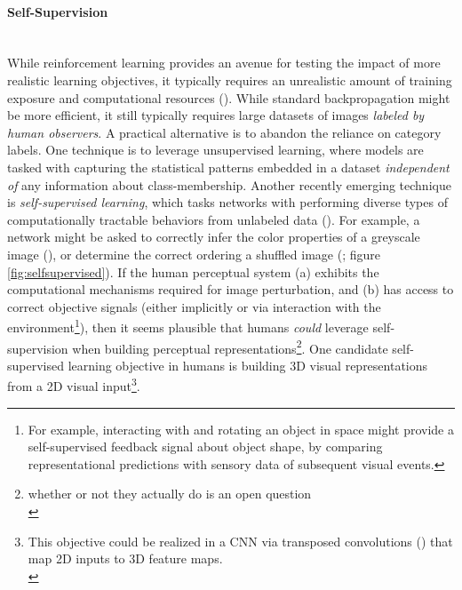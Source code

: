\documentclass[12pt]{article}
\let\oldcite=\cite
\renewcommand{\cite}[1]{\textcolor[rgb]{0, .121, .388}{\oldcite{#1}}}
\begin{document}
\paragraph{Self-Supervision}\mbox{} \\

While reinforcement learning provides an avenue for testing the impact of more realistic learning objectives, it typically requires an unrealistic amount of training exposure and computational resources (\cite{lake2017building}). While standard backpropagation might be more efficient, it still typically requires large datasets of images \emph{labeled by human observers}. A practical alternative is to abandon the reliance on category labels. One technique is to leverage unsupervised learning, where models are tasked with capturing the statistical patterns embedded in a dataset \emph{independent of} any information about class-membership. Another recently emerging technique is \emph{self-supervised learning}, which tasks networks with performing diverse types of computationally tractable behaviors from unlabeled data (\cite{jing2020self}). For example, a network might be asked to correctly infer the color properties of a greyscale image (\cite{zhang2016colorful}), or determine the correct ordering a shuffled image (\cite{noroozi2016unsupervised}; figure \ref{fig:selfsupervised}). If the human perceptual system (a) exhibits the computational mechanisms required for image perturbation, and (b) has access to correct objective signals (either implicitly or via interaction with the environment\footnote{For example, interacting with and rotating an object in space might provide a self-supervised feedback signal about object shape, by comparing representational predictions with sensory data of subsequent visual events.}), then it seems plausible that humans \emph{could} leverage self-supervision when building perceptual representations\footnote{whether or not they actually do is an open question \\}. One candidate self-supervised learning objective in humans is building 3D visual representations from a 2D visual input\footnote{This objective could be realized in a CNN via transposed convolutions (\cite{dumoulin2016guide}) that map 2D inputs to 3D feature maps. \\}.
\end{document}
